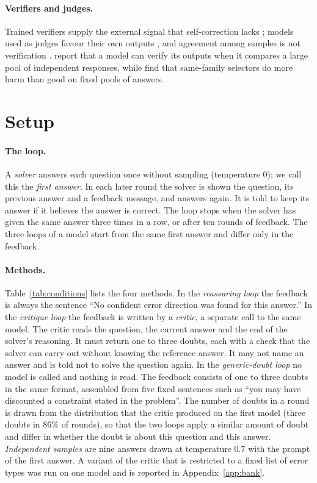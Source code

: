 \documentclass[11pt]{article}
\begin{document}
\paragraph{Verifiers and judges.}
Trained verifiers supply the external signal that self-correction lacks \citep{lightman2024verify}; models used as judges favour their own outputs \citep{zheng2023judging,panickssery2024evaluators}, and agreement among samples is not verification \citep{denisov2026consensus}.
\citet{zhao2025sample} report that a model can verify its outputs when it compares a large pool of independent responses, while \citet{hu2026oracle} find that same-family selectors do more harm than good on fixed pools of answers.

\section{Setup}
\label{sec:setup}

\paragraph{The loop.}
A \emph{solver} answers each question once without sampling (temperature 0); we call this the \emph{first answer}.
In each later round the solver is shown the question, its previous answer and a feedback message, and answers again.
It is told to keep its answer if it believes the answer is correct.
The loop stops when the solver has given the same answer three times in a row, or after ten rounds of feedback.
The three loops of a model start from the same first answer and differ only in the feedback.

\paragraph{Methods.}
Table~\ref{tab:conditions} lists the four methods.
In the \emph{reassuring loop} the feedback is always the sentence ``No confident error direction was found for this answer.''
In the \emph{critique loop} the feedback is written by a \emph{critic}, a separate call to the same model.
The critic reads the question, the current answer and the end of the solver's reasoning.
It must return one to three doubts, each with a check that the solver can carry out without knowing the reference answer.
It may not name an answer and is told not to solve the question again.
In the \emph{generic-doubt loop} no model is called and nothing is read.
The feedback consists of one to three doubts in the same format, assembled from five fixed sentences such as ``you may have discounted a constraint stated in the problem''.
The number of doubts in a round is drawn from the distribution that the critic produced on the first model (three doubts in 86\% of rounds), so that the two loops apply a similar amount of doubt and differ in whether the doubt is about this question and this answer.
\emph{Independent samples} are nine answers drawn at temperature 0.7 with the prompt of the first answer.
A variant of the critic that is restricted to a fixed list of error types was run on one model and is reported in Appendix~\ref{app:bank}.
\end{document}
